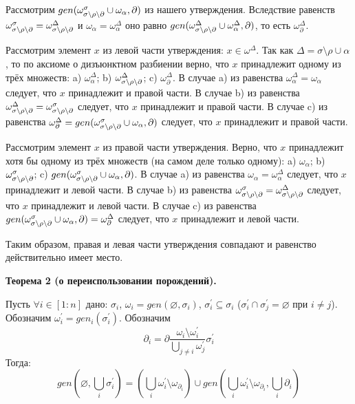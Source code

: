 Рассмотрим $gen(\omega^\sigma_{\sigma\setminus\rho\setminus\partial} \cup \omega_\alpha, \partial)$ из нашего утверждения. Вследствие равенств $\omega^\sigma_{\sigma\setminus\rho\setminus\partial} = \omega^\Delta_{\sigma\setminus\rho\setminus\partial}$ и $\omega_\alpha = \omega^\Delta_\alpha$ оно равно $gen(\omega^\Delta_{\sigma\setminus\rho\setminus\partial} \cup \omega^\Delta_\alpha, \partial)$, то есть $\omega^\Delta_\partial$.

Рассмотрим элемент $x$ из левой части утверждения: $x \in \omega^\Delta$. Так как $\Delta = \sigma\setminus\rho\cup\alpha$, то по аксиоме о дизъюнктном разбиении верно, что $x$ принадлежит одному из трёх множеств: a) $\omega^\Delta_\alpha$; b) $\omega^\Delta_{\sigma\setminus\rho\setminus\partial}$; c) $\omega^\Delta_\partial$. В случае a) из равенства $\omega^\Delta_\alpha = \omega_\alpha$ следует, что $x$ принадлежит и правой части. В случае b) из равенства $\omega^\Delta_{\sigma\setminus\rho\setminus\partial} = \omega^\sigma_{\sigma\setminus\rho\setminus\partial}$ следует, что $x$ принадлежит и правой части. В случае c) из равенства $\omega^\Delta_\partial = gen(\omega^\sigma_{\sigma\setminus\rho\setminus\partial} \cup \omega_\alpha, \partial)$ следует, что $x$ принадлежит и правой части.

Рассмотрим элемент $x$ из правой части утверждения. Верно, что $x$ принадлежит хотя бы одному из трёх множеств (на самом деле только одному): a) $\omega_\alpha$; b) $\omega^\sigma_{\sigma\setminus\rho\setminus\partial}$; c) $gen(\omega^\sigma_{\sigma\setminus\rho\setminus\partial} \cup \omega_\alpha, \partial)$. В случае a) из равенства $\omega_\alpha = \omega^\Delta_\alpha$ следует, что $x$ принадлежит и левой части. В случае b) из равенства $\omega^\sigma_{\sigma\setminus\rho\setminus\partial} = \omega^\Delta_{\sigma\setminus\rho\setminus\partial}$ следует, что $x$ принадлежит и левой части. В случае c) из равенства $gen(\omega^\sigma_{\sigma\setminus\rho\setminus\partial} \cup \omega_\alpha, \partial) = \omega^\Delta_\partial$ следует, что $x$ принадлежит и левой части.

Таким образом, правая и левая части утверждения совпадают и равенство действительно имеет место.

\newpage

\textbf{Теорема 2 (о переиспользовании порождений).}

Пусть $\forall i \in [1:n]$ дано: $\sigma_i$, $\omega_i = gen(\varnothing, \sigma_i)$, $\sigma_i^\prime \subseteq \sigma_i$ ($\sigma_i^\prime \cap \sigma_j^\prime = \varnothing$ при $i \neq j$). Обозначим $\omega_i^\prime = gen_i(\sigma_i^\prime)$. Обозначим 
$$\partial_i = \partial\dfrac{\omega_i \setminus \omega_i^\prime}{\bigcup\limits_{j \neq i} \omega_j^\prime} \sigma_i^\prime$$
Тогда:
$$gen(\varnothing, \bigcup\limits_i \sigma_i^\prime) = \left( \bigcup\limits_i \omega_i^\prime \setminus \omega_{\partial_i} \right) \cup gen(\bigcup\limits_i \omega_i^\prime \setminus \omega_{\partial_i}, \bigcup\limits_i \partial_i)$$

